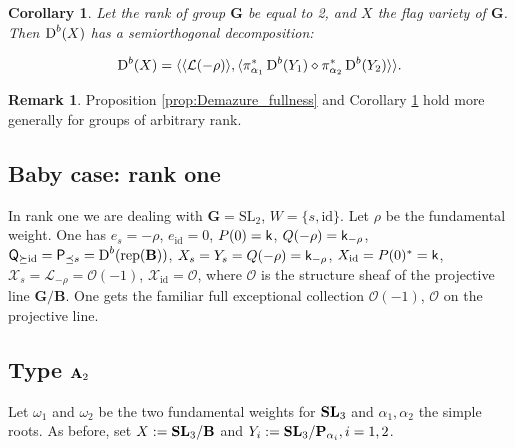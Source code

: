 \documentclass[sn-mathphys-num]{sn-jnl}%
\newcommand{\tX}{{\mathcal X}}
\newcommand{\Oo}{\mathcal O}
\newcommand{\Ll}{\mathcal L}
\newcommand{\rep}{{\mathrm{rep}}}
\newcommand{\id}{{\mathrm{id}}}
\newcommand*{\Dd}{\mathop{\mathrm D\kern0pt}\nolimits}
\newcommand{\sk}{{\sf k}}
\newcommand{\bg}{\mathbf G}
\newcommand{\fb}{\mathbf B}
\newcommand{\bp}{\mathbf P}
\newtheorem{corollary}[theorem]{Corollary}
\theoremstyle{definition}
\newtheorem{remark}[theorem]{Remark}
\begin{document}
\begin{corollary}\label{cor:Demazurefullness}
Let the rank of group $ \bg$ be equal to 2, and $X$ the flag variety of $ \bg$. Then $\Dd ^b(X)$ has a semiorthogonal decomposition:

\begin{equation}
\Dd ^b(X)=\langle \langle \Ll (-\rho)\rangle, \langle \pi _{\alpha _1}^{\ast}\Dd ^b(Y_1)\diamond \pi _{\alpha _2}^{\ast}\Dd ^b(Y_2)\rangle\rangle .
\end{equation}

\end{corollary}

\begin{remark}\label{rem:-rhoSOD}
{Proposition \ref{prop:Demazure_fullness} and Corollary \ref{cor:Demazurefullness} hold more generally for groups of arbitrary rank.}
\end{remark}

\subsection{Baby case: rank one}

In rank one we are dealing with $\bg=\mathrm{SL}_2$, $W=\{s,\id\}$.
Let $\rho$ be the fundamental weight.
One has $e_s=-\rho$, $e_\id=0$, $P(0)=\sk$, $Q(-\rho)=\sk_{-\rho}$, ${\sf Q}_{\succeq \id}={\sf P}_{\preceq s}=
\Dd ^b(\rep(\fb))$, $X_s=Y_s=Q(-\rho)=\sk_{-\rho}$, $X_\id=P(0)^*=\sk$, $\tX_s=\Ll_{-\rho}=\Oo(-1)$, $\tX_\id=\Oo$,
where $\Oo$ is the structure sheaf of the projective line
$\bg/\fb$.
One gets the familiar full
exceptional collection $\Oo(-1)$, $\Oo$ on the projective line.

\subsection{ Type ${\bf A}_2$}\label{subsec:typeA_2}

Let $\omega _1$ and $\omega _2$ be the two fundamental weights for ${\bf SL}_3$ and $\alpha _1,\alpha _2$ the simple roots. As before, set $X:={\bf SL}_3/{\fb}$ and $Y_i:={\bf SL}_3/{\bp}_{\alpha _i}, i=1,2$.
\end{document}
